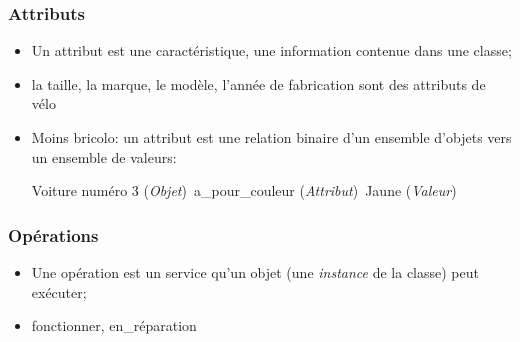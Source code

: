 \documentclass[french]{beamer}
\begin{document}
\begin{frame}
  \begin{center}
\end{center}
\end{frame}


\begin{frame}\frametitle{Attributs}
  \begin{itemize}
\item Un  attribut est  une caractéristique, une  information contenue  dans une
  classe;
  \item  la taille,  la  marque,  le modèle,  l'année  de  fabrication sont  des
    attributs de vélo
    \item  Moins bricolo:  un attribut  est une  relation binaire  d'un ensemble
      d'objets vers un ensemble de valeurs:

      \pause Voiture numéro 3 \pause (\textit{Objet})\pause \ a\_pour\_couleur
      \pause (\textit{Attribut})\pause \ Jaune \pause (\textit{Valeur})
\end{itemize}
\end{frame}


\begin{frame}
  \begin{center}
\end{center}
\end{frame}

\begin{frame}\frametitle{Opérations}

  \begin{itemize}
  \item Une  opération est un service  qu'un objet (une \textit{instance}  de la
    classe) peut exécuter;
    \item fonctionner, en\_réparation
  \end{itemize}
  
\end{frame}



\begin{frame}
  \begin{center}
\end{center}
\end{frame}
\end{document}
